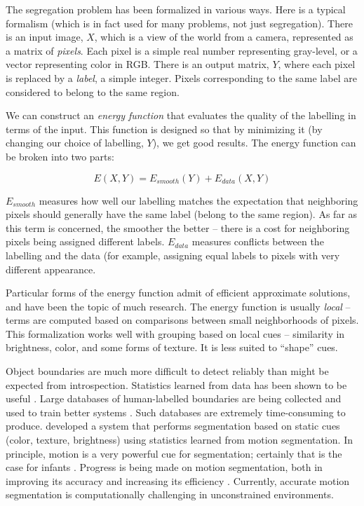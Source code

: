 The segregation problem has been formalized in various ways.  Here is
a typical formalism (which is in fact used for many problems, not just
segregation).  There is an input image, $X$, which is a view of the
world from a camera, represented as a matrix of {\em pixels}.  Each
pixel is a simple real number representing gray-level, or a vector
representing color in RGB.
%
There is an output matrix, $Y$, where each pixel is replaced by
a {\em label}, a simple integer.  Pixels corresponding to the 
same label are considered to belong to the same region.

We can construct an {\em energy function} that evaluates the quality
of the labelling in terms of the input.  This function is designed so
that by minimizing it (by changing our choice of labelling, $Y$), we
get good results.  The energy function can be broken into two
parts:

\begin{displaymath}
%
E(X,Y) = E_{smooth}(Y) + E_{data}(X,Y)
%
\end{displaymath}

$E_{smooth}$ measures how well our labelling matches the
expectation that neighboring pixels should generally have the
same label (belong to the same region).
As far as this term is concerned, the smoother the better -- there is
a cost for neighboring pixels being assigned different labels.
$E_{data}$ measures conflicts between the labelling and the data (for
example, assigning equal labels to pixels with very different
appearance.

Particular forms of the energy function admit of efficient 
approximate solutions, and have been the topic of much research.
%
The energy function is usually {\em local} -- terms are computed 
based on comparisons between small neighborhoods of pixels.
%
This formalization works well with grouping based on local
cues -- similarity in brightness, color, and some forms of texture.
It is less suited to ``shape'' cues.


Object boundaries are much more difficult to detect reliably than might be 
expected from introspection.
Statistics learned from data has been shown to be useful
\cite{konishi03statistical}.  Large databases of 
human-labelled boundaries are being collected and
used to train better systems
\cite{martin04learning}.
%
Such databases are extremely time-consuming to produce.
%
 developed a system that performs
segmentation based on static cues (color, texture, brightness)
using statistics learned from motion segmentation.
In principle, motion is a very powerful cue for
segmentation; certainly that is the case for infants
\cite{kellman93kinematic}.
%
Progress is being made on motion segmentation, both 
in improving its accuracy and increasing its efficiency
 \cite{cremers05motion,fowlkes04spectral,smith03motion,smith04layered}.
%
Currently, accurate motion segmentation is 
computationally challenging in unconstrained environments.




